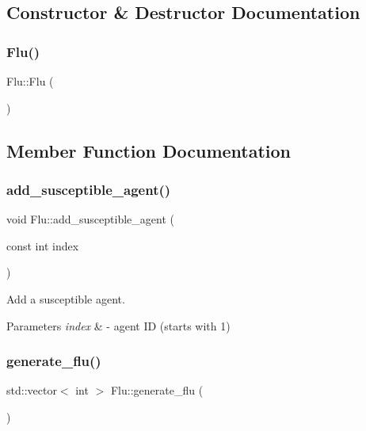 \subsection{Constructor \& Destructor Documentation}
\mbox{\label{classFlu_a3714dffff12b88b76547388c14c72ea4}} 
\subsubsection{\texorpdfstring{Flu()}{Flu()}}
{\footnotesize\ttfamily Flu\+::\+Flu (\begin{DoxyParamCaption}{ }\end{DoxyParamCaption})\hspace{0.3cm}{\ttfamily [default]}}



\subsection{Member Function Documentation}
\mbox{\label{classFlu_a8ec452eddf296a91812b3eaa29183958}} 
\subsubsection{\texorpdfstring{add\+\_\+susceptible\+\_\+agent()}{add\_susceptible\_agent()}}
{\footnotesize\ttfamily void Flu\+::add\+\_\+susceptible\+\_\+agent (\begin{DoxyParamCaption}\item[{const int}]{index }\end{DoxyParamCaption})\hspace{0.3cm}{\ttfamily [inline]}}



Add a susceptible agent. 


\begin{DoxyParams}{Parameters}
{\em index} & -\/ agent ID (starts with 1) \\
\hline
\end{DoxyParams}
\mbox{\label{classFlu_a86d9c227590e493eb7ecb26e55b2a1eb}} 
\subsubsection{\texorpdfstring{generate\+\_\+flu()}{generate\_flu()}}
{\footnotesize\ttfamily std\+::vector$<$ int $>$ Flu\+::generate\+\_\+flu (\begin{DoxyParamCaption}{ }\end{DoxyParamCaption})}



